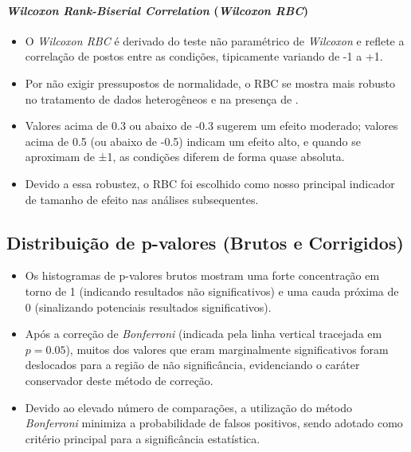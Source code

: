 \paragraph{\textit{Wilcoxon Rank-Biserial Correlation} (\textit{Wilcoxon RBC})}
\begin{itemize}
    \item O \textit{Wilcoxon RBC} é derivado do teste não paramétrico de \textit{Wilcoxon} e reflete a correlação de postos entre as condições, tipicamente variando de -1 a +1.
    \item Por não exigir pressupostos de normalidade, o RBC se mostra mais robusto no tratamento de dados heterogêneos e na presença de .
    \item Valores acima de 0.3 ou abaixo de -0.3 sugerem um efeito moderado; valores acima de 0.5 (ou abaixo de -0.5) indicam um efeito alto, e quando se aproximam de ±1, as condições diferem de forma quase absoluta.
    \item Devido a essa robustez, o RBC foi escolhido como nosso principal indicador de tamanho de efeito nas análises subsequentes.
\end{itemize}

\subsection{Distribuição de p-valores (Brutos e Corrigidos)}
\begin{itemize}
    \item Os histogramas de p-valores brutos mostram uma forte concentração em torno de 1 (indicando resultados não significativos) e uma cauda próxima de 0 (sinalizando potenciais resultados significativos).
    \item Após a correção de \textit{Bonferroni} (indicada pela linha vertical tracejada em \(p=0.05\)), muitos dos valores que eram marginalmente significativos foram deslocados para a região de não significância, evidenciando o caráter conservador deste método de correção.
    \item Devido ao elevado número de comparações, a utilização do método \textit{Bonferroni} minimiza a probabilidade de falsos positivos, sendo adotado como critério principal para a significância estatística.
\end{itemize}

